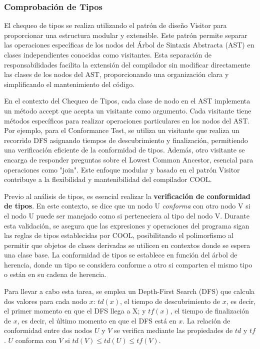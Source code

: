 \documentclass[10pt]{article} %
\begin{document}
	\subsubsection{Comprobaci\'on de Tipos}
	
	El chequeo de tipos se realiza utilizando el patrón de diseño Visitor para proporcionar una estructura modular y extensible. Este patrón permite separar las operaciones específicas de los nodos del Árbol de Sintaxis Abstracta (AST) en clases independientes conocidas como visitantes. Esta separación de responsabilidades facilita la extensión del compilador sin modificar directamente las clases de los nodos del AST, proporcionando una organización clara y simplificando el mantenimiento del código.
	
	En el contexto del Chequeo de Tipos, cada clase de nodo en el AST implementa un método accept que acepta un visitante como argumento. Cada visitante tiene métodos específicos para realizar operaciones particulares en los nodos del AST. Por ejemplo, para el Conformance Test, se utiliza un visitante que realiza un recorrido DFS asignando tiempos de descubrimiento y finalización, permitiendo una verificación eficiente de la conformidad de tipos. Además, otro visitante se encarga de responder preguntas sobre el Lowest Common Ancestor, esencial para operaciones como "join". Este enfoque modular y basado en el patrón Visitor contribuye a la flexibilidad y mantenibilidad del compilador COOL.
	
 	Previo al análisis de tipos, es esencial realizar la \textbf{verificación de conformidad de tipos}. En este contexto, se dice que un nodo U \textit{conforma} con otro nodo V si el nodo U puede ser manejado como si perteneciera al tipo del nodo V. Durante esta validación, se asegura que las expresiones y operaciones del programa sigan las reglas de tipos establecidas por COOL, posibilitando el polimorfismo al permitir que objetos de clases derivadas se utilicen en contextos donde se espera una clase base. La conformidad de tipos se establece en función del árbol de herencia, donde un tipo se considera conforme a otro si comparten el mismo tipo o están en su cadena de herencia. 
	
	Para llevar a cabo esta tarea, se emplea un Depth-First Search (DFS) que calcula dos valores para cada nodo $x$: $td(x)$, el tiempo de descubrimiento de $x$, es decir, el primer momento en que el DFS llega a X; y $tf(x)$, el tiempo de finalización de $x$, es decir, el último momento en que el DFS está en $x$. La relación de conformidad entre dos nodos $U$ y $V$ se verifica mediante las propiedades de $td$ y $tf$. $U$ conforma con $V$ si $td(V) \leq td(U) \leq tf(V)$.
	
\end{document}
